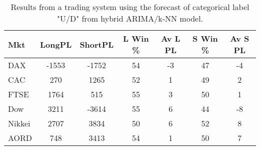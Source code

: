 \begin{table}[ht]
\centering
\caption[Results from a trading system using the forecast of categorical label "U/D" from hybrid ARIMA/k-NN model]{Results from a trading system using the forecast of categorical label "U/D" from hybrid ARIMA/k-NN model.} 
\label{tab:chp_ts:pUD_CAT_arima_knn_sys}
\begin{tabular}{lcccccc}
  \toprule Mkt & LongPL & ShortPL & L Win \% & Av L PL & S Win \% & Av S PL \\ 
  \midrule DAX & -1553 & -1752 & 54 & -3 & 47 & -4 \\ 
  CAC & 270 & 1265 & 52 & 1 & 49 & 2 \\ 
  FTSE & 1764 & 515 & 55 & 3 & 50 & 1 \\ 
  Dow & 3211 & -3614 & 55 & 6 & 44 & -8 \\ 
  Nikkei & 2707 & 3834 & 50 & 6 & 52 & 8 \\ 
  AORD & 748 & 3413 & 54 & 1 & 50 & 7 \\ 
   \bottomrule \end{tabular}
\end{table}
